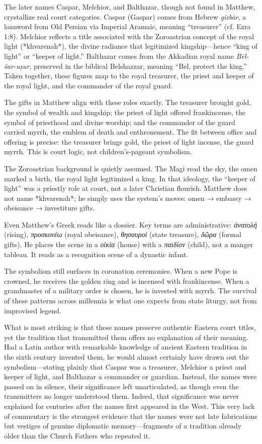The later names Caspar, Melchior, and Balthazar, though not found in Matthew, crystallize real court categories.
Caspar (Gaspar) comes from Hebrew \textit{gizbār}, a loanword from Old Persian via Imperial Aramaic, meaning “treasurer” (cf. Ezra 1:8).
Melchior reflects a title associated with the Zoroastrian concept of the royal light (*khvarenah*), the divine radiance that legitimized kingship—hence “king of light” or “keeper of light.”
Balthazar comes from the Akkadian royal name \textit{Bēl-šar-uṣur}, preserved in the biblical Belshazzar, meaning “Bel, protect the king.”
Taken together, these figures map to the royal treasurer, the priest and keeper of the royal light, and the commander of the royal guard.

The gifts in Matthew align with these roles exactly.
The treasurer brought gold, the symbol of wealth and kingship; the priest of light offered frankincense, the symbol of priesthood and divine worship; and the commander of the guard carried myrrh, the emblem of death and enthronement.
The fit between office and offering is precise: the treasurer brings gold, the priest of light incense, the guard myrrh.
This is court logic, not children’s-pageant symbolism.

The Zoroastrian background is quietly assumed.
The Magi read the sky, the omen marked a birth, the royal light legitimized a king.
In that ideology, the “keeper of light” was a priestly role at court, not a later Christian flourish.
Matthew does not name *khvarenah*; he simply uses the system’s moves: omen → embassy → obeisance → investiture gifts.

Even Matthew’s Greek reads like a dossier.
Key terms are administrative: \textit{ἀνατολή} (rising), \textit{προσκυνέω} (royal obeisance), \textit{θησαυροί} (state treasure), \textit{δῶρα} (formal gifts).
He places the scene in a \textit{οἰκία} (house) with a \textit{παιδίον} (child), not a manger tableau.
It reads as a recognition scene of a dynastic infant.

The symbolism still surfaces in coronation ceremonies.
When a new Pope is crowned, he receives the golden ring and is incensed with frankincense.
When a grandmaster of a military order is chosen, he is invested with myrrh.
The survival of these patterns across millennia is what one expects from state liturgy, not from improvised legend.

What is most striking is that these names preserve authentic Eastern court titles, yet the tradition that transmitted them offers no explanation of their meaning.
Had a Latin author with remarkable knowledge of ancient Eastern tradition in the sixth century invented them, he would almost certainly have drawn out the symbolism—stating plainly that Caspar was a treasurer, Melchior a priest and keeper of light, and Balthazar a commander or guardian.
Instead, the names were passed on in silence, their significance left unarticulated, as though even the transmitters no longer understood them.
Indeed, that significance was never explained for centuries after the names first appeared in the West.
This very lack of commentary is the strongest evidence that the names were not late fabrications but vestiges of genuine diplomatic memory—fragments of a tradition already older than the Church Fathers who repeated it.

